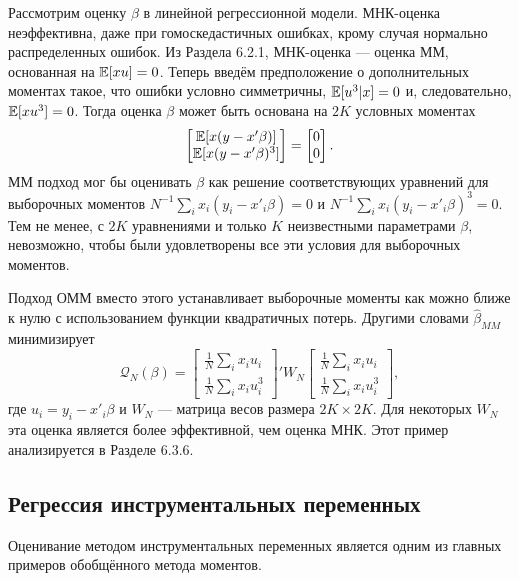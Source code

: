 Рассмотрим оценку $\beta$ в линейной регрессионной модели. МНК-оценка неэффективна, даже при гомоскедастичных ошибках, крому случая нормально распределенных ошибок. Из Раздела 6.2.1, МНК-оценка --- оценка ММ, основанная на $\mathbb{E}[xu]=0$. Теперь введём предположение о дополнительных моментах такое, что ошибки условно симметричны, $\mathbb{E}[u^3|x]=0$ и, следовательно, $\mathbb{E}[x u^3]=0$. Тогда оценка $\beta$ может быть основана на $2K$ условных моментах 
\[
\begin{bmatrix} \mathbb{E}[x(y-x'\beta)] \\ \mathbb{E}[x(y-x'\beta)^3] \end{bmatrix} = \begin{bmatrix} 0 \\ 0 \end{bmatrix}.
\]
ММ подход мог бы оценивать $\beta$ как решение соответствующих уравнений для выборочных моментов $N^{-1} \sum_i x_i(y_i-x'_i\beta)=0$ и $N^{-1} \sum_i x_i(y_i-x'_i\beta)^3=0$. Тем не менее, с $2K$ уравнениями и только $K$ неизвестными параметрами $\beta$, невозможно, чтобы были удовлетворены все эти условия для выборочных моментов.

Подход ОММ вместо этого устанавливает выборочные моменты как можно ближе к нулю с использованием функции квадратичных потерь. Другими словами $\hat{\beta}_{MM}$ минимизирует
\begin{equation}
\mathcal{Q}_{N}(\beta)= \begin{bmatrix}\frac{1}{N} \sum_i x_i u_i \\ \frac{1}{N} \sum_i x_i u^3_i \end{bmatrix}' W_N \begin{bmatrix}\frac{1}{N} \sum_i x_i u_i \\ \frac{1}{N} \sum_i x_i u^3_i \end{bmatrix},
\end{equation}
где $u_i=y_i-x'_i\beta$ и $W_N$ --- матрица весов размера $2K \times 2K$. Для некоторых $W_N$ эта оценка является более эффективной, чем оценка МНК. Этот пример анализируется в Разделе 6.3.6.

\subsection{Регрессия инструментальных переменных}

Оценивание методом инструментальных переменных является одним из главных примеров обобщённого метода моментов.

